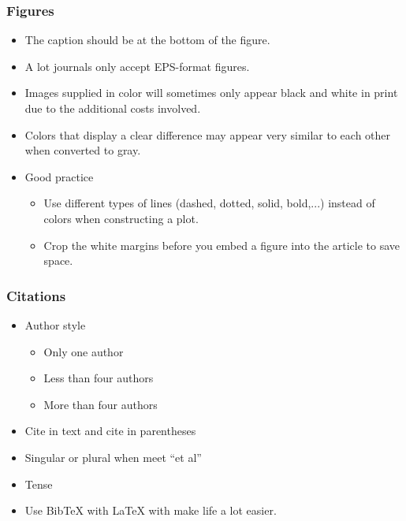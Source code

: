 \documentclass[10pt]{beamer}
\begin{document}
\begin{frame}
  \frametitle{Figures}

  \begin{itemize}
  \item The caption should be at the bottom of the figure.
  \item A lot journals only accept EPS-format figures.
  \item Images supplied in color will sometimes only appear black and white in
    print due to the additional costs involved.
  \item Colors that display a clear difference may appear very similar to each
    other when converted to gray.

  \item Good practice

    \begin{itemize}
    \item Use different types of lines (dashed, dotted, solid, bold,...)
      instead of colors when constructing a plot.
    \item Crop the white margins before you embed a figure into the article to
      save space.
    \end{itemize}


  \end{itemize}
\end{frame}


\begin{frame}
  \frametitle{Citations}

  \begin{itemize}
  \item Author style
  \begin{itemize}
  \item Only one author
  \item Less than four authors
  \item More than four authors
  \end{itemize}

\item Cite in text and cite in parentheses

\item Singular or plural when meet ``et al''

\item Tense

\item Use BibTeX with LaTeX with make life a lot easier.

  \end{itemize}

\end{frame}
\end{document}
